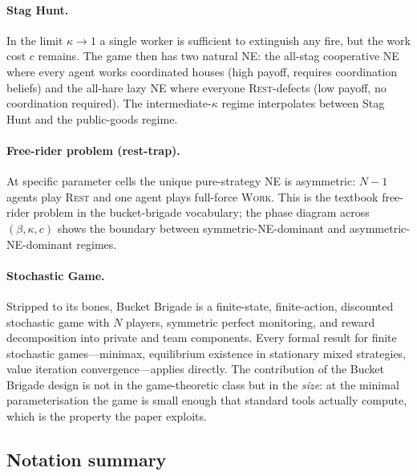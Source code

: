 \documentclass{anvil-paper}
\begin{document}
\paragraph{Stag Hunt.}
In the limit $\kappa\to 1$ a single worker is sufficient to extinguish
any fire, but the work cost $c$ remains. The game then has two natural
NE: the all-stag cooperative NE where every agent works coordinated
houses (high payoff, requires coordination beliefs) and the all-hare
lazy NE where everyone \textsc{Rest}-defects (low payoff, no coordination
required). The intermediate-$\kappa$ regime interpolates between Stag
Hunt and the public-goods regime.

\paragraph{Free-rider problem (rest-trap).}
At specific parameter cells the unique pure-strategy NE is asymmetric:
$N{-}1$ agents play \textsc{Rest} and one agent plays full-force
\textsc{Work}. This is the textbook free-rider problem in the
bucket-brigade vocabulary; the phase diagram across $(\beta,\kappa,c)$
shows the boundary between symmetric-NE-dominant and
asymmetric-NE-dominant regimes.

\paragraph{Stochastic Game.}
Stripped to its bones, Bucket Brigade is a finite-state, finite-action,
discounted stochastic game with $N$ players, symmetric perfect
monitoring, and reward decomposition into private and team components.
Every formal result for finite stochastic games---minimax, equilibrium
existence in stationary mixed strategies, value iteration
convergence---applies directly. The contribution of the Bucket Brigade
design is not in the game-theoretic class but in the \emph{size}: at the
minimal parameterisation the game is small enough that standard tools
actually compute, which is the property the paper exploits.

\subsection{Notation summary}
\label{app:envspec:notation}
\end{document}
